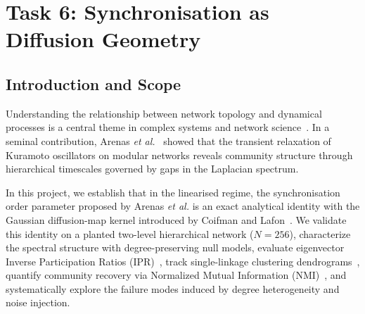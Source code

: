 \chapter{Task 6: Synchronisation as Diffusion Geometry}
\label{chap:task6}


\begin{abstract}
We examine the hypothesis by which transient synchronisation in the Kuramoto model reveals hierarchical community structure in complex networks. In the linearised regime around the steady state, we prove an exact analytical identity demonstrating that the pairwise order parameter $\rho_{ij}(t) = \langle \cos(\theta_i - \theta_j) \rangle$ is equivalent to a diffusion-map kernel $\exp(-d_t^2(i,j)/2)$, where $d_t(i,j)$ is the network's diffusion distance at time $t$. We validate this identity on a synthetic two-level hierarchical network ($N=256$, $z_{\mathrm{in}1}=13, z_{\mathrm{in}2}=4, z_{\mathrm{out}}=1$) using RK4 numerical simulations. By comparing the Laplacian spectrum against a degree-preserving null model and computing the Inverse Participation Ratio (IPR), we separate delocalised structural modes from localized bulk noise. We show that spectral gaps dictate transient plateaus in single-linkage component counts. Furthermore, we analyze two key failure mechanisms of synchronization: targeted degree heterogeneity (hubs), where adding 8 hubs ($\sim 3\%$ of nodes) destroys plateau formation by placing hubs at the diffusion centroid, and structural noise injection (increasing $z_{\mathrm{out}}$), showing that plateau visibility degrades before the spectral gaps collapse.
\end{abstract}

\section{Introduction and Scope}
\label{sec:t6_intro}
Understanding the relationship between network topology and dynamical processes is a central theme in complex systems and network science~\cite{arenas2008}. In a seminal contribution, Arenas \textit{et al.}~\cite{arenas2006} showed that the transient relaxation of Kuramoto oscillators on modular networks reveals community structure through hierarchical timescales governed by gaps in the Laplacian spectrum.

In this project, we establish that in the linearised regime, the synchronisation order parameter proposed by Arenas \textit{et al.} is an exact analytical identity with the Gaussian diffusion-map kernel introduced by Coifman and Lafon~\cite{coifman2006}. We validate this identity on a planted two-level hierarchical network ($N=256$), characterize the spectral structure with degree-preserving null models, evaluate eigenvector Inverse Participation Ratios (IPR)~\cite{pradhan2017}, track single-linkage clustering dendrograms~\cite{sibson1973}, quantify community recovery via Normalized Mutual Information (NMI)~\cite{danon2005}, and systematically explore the failure modes induced by degree heterogeneity and noise injection.

